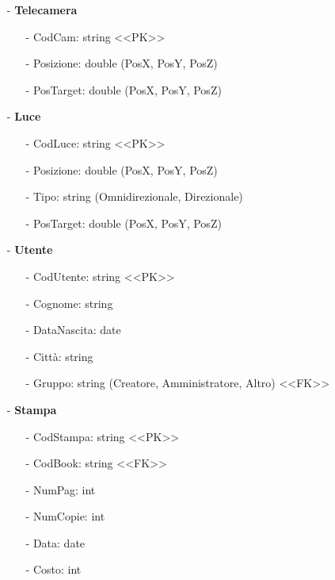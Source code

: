 \documentclass[a4paper,12pt]{report}
\begin{document}
\begin{itemize}
	\item[-] {\bf Telecamera}
		\begin{small}\begin{itemize}
			\item[-] CodCam: string <\-<PK>\->
			\item[-] Posizione: double (PosX, PosY, PosZ)
			\item[-] PosTarget: double (PosX, PosY, PosZ)
		\end{itemize}\end{small}
\end{itemize}
\begin{itemize}
	\item[-] {\bf Luce}
		\begin{small}\begin{itemize}
			\item[-] CodLuce: string <\-<PK>\->
			\item[-] Posizione: double (PosX, PosY, PosZ)
			\item[-] Tipo: string (Omnidirezionale, Direzionale)
			\item[-] PosTarget: double (PosX, PosY, PosZ) 
		\end{itemize}\end{small}
\end{itemize}
\begin{itemize}
	\item[-] {\bf Utente}
		\begin{small}\begin{itemize}
			\item[-] CodUtente: string <\-<PK>\->
			\item[-] Cognome: string
			\item[-] DataNascita: date
			\item[-] Città: string
			\item[-] Gruppo: string (Creatore, Amministratore, Altro) <\-<FK>\->
		\end{itemize}\end{small}
\end{itemize}
\begin{itemize}
	\item[-] {\bf Stampa}
		\begin{small}\begin{itemize}
			\item[-] CodStampa: string <\-<PK>\->
			\item[-] CodBook: string <\-<FK>\->
			\item[-] NumPag: int
			\item[-] NumCopie: int
			\item[-] Data: date
			\item[-] Costo: int
		\end{itemize}\end{small}
\end{itemize}
\end{document}
